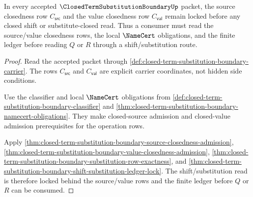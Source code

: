 \begin{theorem}
\label{thm:closed-term-substitution-boundary-namecert-source-lock}
In every accepted $\ClosedTermSubstitutionBoundaryUp$ packet, the source closedness row $C_{\mathsf{src}}$ and the value closedness row $C_{\mathsf{val}}$ remain locked before any closed shift or substitute-closed read. Thus a consumer must read the source/value closedness rows, the local $\NameCert$ obligations, and the finite ledger before reading $Q$ or $R$ through a shift/substitution route.
\end{theorem}
\begin{proof}
Read the accepted packet through \autoref{def:closed-term-substitution-boundary-carrier}. The rows $C_{\mathsf{src}}$ and $C_{\mathsf{val}}$ are explicit carrier coordinates, not hidden side conditions.

Use the classifier and local $\NameCert$ obligations from \autoref{def:closed-term-substitution-boundary-classifier} and \autoref{thm:closed-term-substitution-boundary-namecert-obligations}. They make closed-source admission and closed-value admission prerequisites for the operation rows.

Apply \autoref{thm:closed-term-substitution-boundary-source-closedness-admission}, \autoref{thm:closed-term-substitution-boundary-value-closedness-admission}, \autoref{thm:closed-term-substitution-boundary-substitution-row-exactness}, and \autoref{thm:closed-term-substitution-boundary-shift-substitution-ledger-lock}. The shift/substitution read is therefore locked behind the source/value rows and the finite ledger before $Q$ or $R$ can be consumed.
\end{proof}

